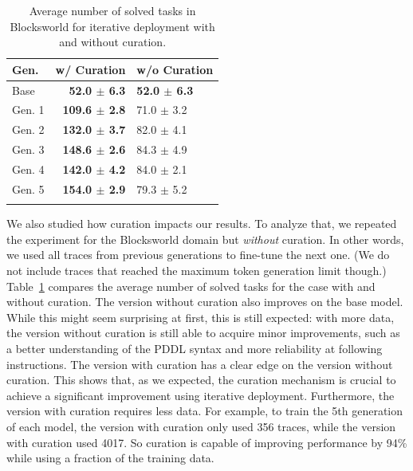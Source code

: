 \documentclass{article}
\begin{document}
\begin{table}
\vspace{-10pt}
\centering
\begin{tabular}{lrl}
\toprule
\textbf{Gen.} & \textbf{w/ Curation}     & \textbf{w/o Curation}   \\ \midrule
Base          & \textbf{52.0 $\pm$ 6.3}  & \textbf{52.0 $\pm$ 6.3} \\
Gen. 1        & \textbf{109.6 $\pm$ 2.8} & 71.0 $\pm$ 3.2          \\
Gen. 2        & \textbf{132.0 $\pm$ 3.7} & 82.0 $\pm$ 4.1          \\
Gen. 3        & \textbf{148.6 $\pm$ 2.6} & 84.3 $\pm$ 4.9          \\
Gen. 4        & \textbf{142.0 $\pm$ 4.2} & 84.0 $\pm$ 2.1          \\
Gen. 5        & \textbf{154.0 $\pm$ 2.9} & 79.3 $\pm$ 5.2          \\
\bottomrule                                                        \\
\end{tabular}
\caption{Average number of solved tasks in Blocksworld for iterative deployment
  with and without curation.
}
\label{tab:no-curation}
\vspace{-1pt}
\end{table}


We also studied how curation impacts our results. To analyze that, we repeated
the experiment for the Blocksworld domain but \emph{without} curation. In other words,
we used all traces from previous generations to fine-tune the next one. (We do
not include traces that reached the maximum token generation limit though.)
Table~\ref{tab:no-curation} compares the average number of solved tasks for the
case with and without curation. The version without curation also improves on
the base model. While this might seem surprising at first, this is still
expected: with more data, the version without curation is still able to acquire
minor improvements, such as a better understanding of the PDDL syntax and more
reliability at following instructions.
The version with curation has a clear edge on the version without curation. This
shows that, as we expected, the curation mechanism is crucial to achieve a
significant improvement using iterative deployment.
Furthermore, the version with curation requires less data. For example, to train
the 5th generation of each model, the version with curation only used 356
traces, while the version with curation used 4017. So curation is capable of
improving performance by 94\% while using a fraction of the training data.
\end{document}

